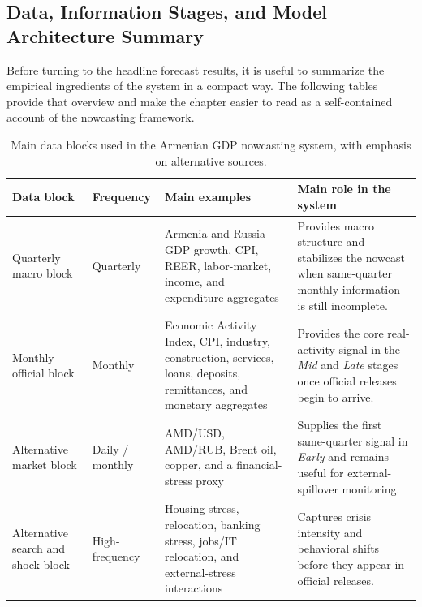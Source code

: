 \documentclass[12pt,a4paper]{report}
\begin{document}
\subsection{Data, Information Stages, and Model Architecture Summary}

Before turning to the headline forecast results, it is useful to summarize the empirical ingredients of the system in a compact way. The following tables provide that overview and make the chapter easier to read as a self-contained account of the nowcasting framework.

\begin{table}[H]
    \centering
    \footnotesize
    \setlength{\tabcolsep}{4pt}
    \caption{Main data blocks used in the Armenian GDP nowcasting system, with emphasis on alternative sources.}
    \label{tab:data_blocks_used}
    \begin{tabularx}{\textwidth}{@{}>{\raggedright\arraybackslash}p{2.15cm}>{\raggedright\arraybackslash}p{1.45cm}YY@{}}
        \toprule
        Data block & Frequency & Main examples & Main role in the system \\
        \midrule
        Quarterly macro block & Quarterly & Armenia and Russia GDP growth, CPI, REER, labor-market, income, and expenditure aggregates & Provides macro structure and stabilizes the nowcast when same-quarter monthly information is still incomplete. \\
        Monthly official block & Monthly & Economic Activity Index, CPI, industry, construction, services, loans, deposits, remittances, and monetary aggregates & Provides the core real-activity signal in the \textit{Mid} and \textit{Late} stages once official releases begin to arrive. \\
        Alternative market block & Daily / monthly & AMD/USD, AMD/RUB, Brent oil, copper, and a financial-stress proxy & Supplies the first same-quarter signal in \textit{Early} and remains useful for external-spillover monitoring. \\
        Alternative search and shock block & High-frequency & Housing stress, relocation, banking stress, jobs/IT relocation, and external-stress interactions & Captures crisis intensity and behavioral shifts before they appear in official releases. \\
        \bottomrule
    \end{tabularx}
\end{table}
\end{document}
